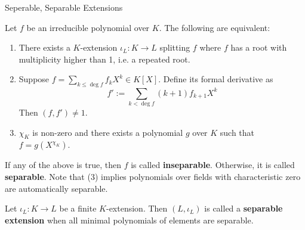 \documentclass[../book.tex]{subfiles}
\begin{document}
\begin{dfn} Seperable, Separable Extensions

    Let $f$ be an irreducible polynomial over $K$. 
    The following are equivalent: 
    \begin{enumerate}
        \item There exists a $K$-extension $\iota_L : K \to L$ splitting $f$ where
        $f$ has a root with multiplicity higher than 1, i.e. a repeated root.
        \item Suppose $f = \sum_{k \leq \deg f} f_k X^k \in K[X]$.
        Define its formal derivative as 
        \[ f' := \sum_{k < \deg f} (k+1)f_{k+1}X^k \]
        Then $(f,f') \neq 1$.
        \item $\chi_K$ is non-zero and there exists a polynomial $g$ over $K$
        such that $f = g(X^{\chi_K})$.
    \end{enumerate}
    If any of the above is true, then $f$ is called \textbf{inseparable}.
    Otherwise, it is called \textbf{separable}.
    Note that (3) implies polynomials over fields with characteristic zero
    are automatically separable. 
    
    Let $\iota_L : K \to L$ be a finite $K$-extension.
    Then $(L,\iota_L)$ is called a \textbf{separable extension} when
    all minimal polynomials of elements are separable. 
\end{dfn}
\end{document}
